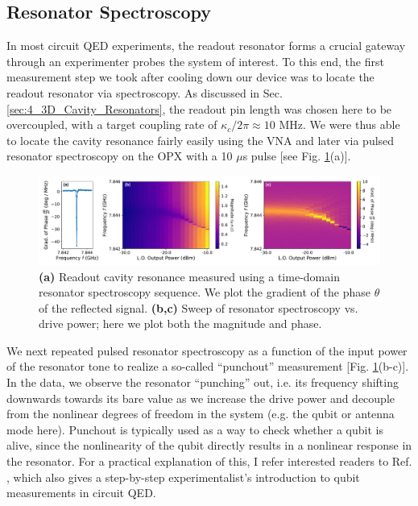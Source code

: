 \subsection{Resonator Spectroscopy}
In most circuit QED experiments, the readout resonator forms a crucial gateway through an experimenter probes the system of interest. To this end, the first measurement step we took after cooling down our device was to locate the readout resonator via spectroscopy. As discussed in Sec. \ref{sec:4_3D_Cavity_Resonators}, the readout pin length was chosen here to be overcoupled, with a target coupling rate of $\kappa_c/2\pi \approx 10$ MHz. We were thus able to locate the cavity resonance fairly easily using the VNA and later via pulsed resonator spectroscopy on the OPX with a 10 $\mu$s pulse [see Fig. \ref{fig:4_resonator_spectroscopy}(a)].
\begin{figure}[h!]
    \centering
    \includegraphics[width=\linewidth]{Figures/4/resonator_spectroscopy.pdf}
    \caption{\textbf{(a)} Readout cavity resonance measured using a time-domain resonator spectroscopy sequence. We plot the gradient of the phase $\theta$ of the reflected signal. \textbf{(b,c)} Sweep of resonator spectroscopy vs. drive power; here we plot both the magnitude and phase.}
    \label{fig:4_resonator_spectroscopy}
\end{figure}

We next repeated pulsed resonator spectroscopy as a function of the input power of the resonator tone to realize a so-called ``punchout'' measurement [Fig. \ref{fig:4_resonator_spectroscopy}(b-c)]. In the data, we observe the resonator ``punching'' out, i.e. its frequency shifting downwards towards its bare value as we increase the drive power and decouple from the nonlinear degrees of freedom in the system (e.g. the qubit or antenna mode here). Punchout is typically used as a way to check whether a qubit is alive, since the nonlinearity of the qubit directly results in a nonlinear response in the resonator. For a practical explanation of this, I refer interested readers to Ref. \cite{naghiloo2019introduction}, which also gives a step-by-step experimentalist's introduction to qubit measurements in circuit QED. 

